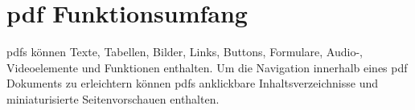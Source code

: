 \section{\gls{pdf} Funktionsumfang}
\gls{pdf}s können Texte, Tabellen, Bilder, Links, Buttons, Formulare, Audio-, Videoelemente und Funktionen enthalten.
Um die Navigation innerhalb eines \gls{pdf} Dokuments zu erleichtern können \gls{pdf}s anklickbare Inhaltsverzeichnisse und miniaturisierte Seitenvorschauen enthalten.
